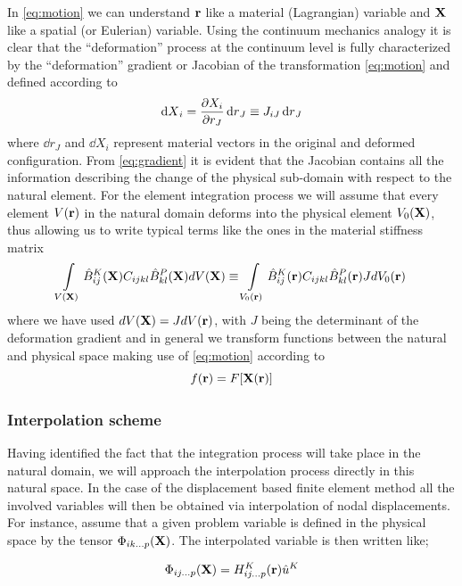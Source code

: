 In \cref{eq:motion} we can understand $\vb{r}$ like a material (Lagrangian) variable and $\vb{X}$ like a spatial (or Eulerian) variable. Using the continuum mechanics analogy it is clear that the ``deformation'' process at the continuum level is fully characterized by the ``deformation'' gradient or Jacobian of the transformation \cref{eq:motion} and defined according to
\begin{equation}
\dd{X}_i=\pdv{X_i}{r_J}\dd{r}_J\equiv J_{iJ}\dd{r}_{J}
\label{eq:gradient}
\end{equation}
where $\dd{r}_{J}$ and $\dd{X}_i$ represent material vectors in the original and deformed configuration. From \cref{eq:gradient} it is evident that the Jacobian contains all the information describing the change of the physical sub-domain with respect to the natural element. For the element integration process we will assume that every element $V(\vb{r})$ in the natural domain deforms into the physical element $V_0(\vb{X})$, thus allowing us to write typical terms like the ones in the material stiffness matrix
\begin{equation}
\int\limits_{V(\vb{X})} \hat{B}_{ij}^K(\vb{X}) C_{ijkl} \hat{B}_{kl}^P(\vb{X}) dV(\vb{X})\equiv \int\limits_{V_0(\vb{r})} \hat{B}_{ij}^K(\vb{r}) C_{ijkl} \hat{B}_{kl}^P(\vb{r})J dV_0(\vb{r})
\label{eq:matmatrix}
\end{equation}
where we have used $dV(\vb{X})=JdV(\vb{r})$, with $J$ being the determinant of the deformation gradient and in general we transform functions between the natural and physical space making use of \cref{eq:motion} according to
\begin{equation}
f(\vb{r})=F[\vb{X}(\vb{r})]
\label{eq:funtrans}
\end{equation}


\subsubsection*{Interpolation scheme}
Having identified the fact that the integration process will take place in the natural domain, we will approach the interpolation process directly in this natural space. In the case of the displacement based finite element method all the involved variables will then be obtained via interpolation of nodal displacements. For instance, assume that a given problem variable is defined in the physical space by the tensor $\Phi_{ik...p}(\vb{X})$. The interpolated variable is then written like;

\begin{equation}
\Phi_{ij...p}(\vb{X})=H_{ij...p}^K(\vb{r})\hat{u}^K
\label{eq:interpol}
\end{equation}

